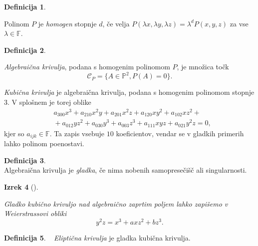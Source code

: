 \documentclass[12pt,a4paper,twoside]{article}
\theoremstyle{definition} %
\newtheorem{definicija}{Definicija}[section]
\theoremstyle{plain} %
\newtheorem{izrek}[definicija]{Izrek}
\numberwithin{equation}{section}  %
\newcommand{\F}{\mathbb F}
\begin{document}
\begin{definicija}~

Polinom $P$ je \emph{homogen} stopnje $d$, če velja $P(\lambda x,\lambda y, \lambda z) = \lambda ^d P(x,y,z)$ za vse $\lambda \in \F$.
\end{definicija}

\begin{definicija}~

\emph{Algebraična krivulja}, podana s homogenim polinomom $P$, je množica točk 
$$\mathcal{C}_P= \{ A \in \mathbb{P}^2, P(A) = 0 \}.$$
\end{definicija}

\emph{Kubična krivulja} je algebraična krivulja, podana s homogenim polinomom stopnje 3. V splošnem je torej oblike
\begin{align}
&{} a_{300}x^3+a_{210}x^2y+a_{201}x^2z+a_{120}xy^2+a_{102}xz^2+ \nonumber \\
&{}+a_{012}yz^2+a_{030}y^3+a_{003}z^3+a_{111}xyz+a_{021}y^2z = 0, \nonumber
\end{align}
kjer so $a_{ijk} \in \F$.
Ta zapis vsebuje $10$ koeficientov, vendar se v gladkih primerih lahko polinom poenostavi.
\begin{definicija}~\\
Algebraična krivulja je \emph{gladka}, če nima nobenih samopresečišč ali singularnosti.
\end{definicija}

\begin{izrek}[]~

Gladko kubično krivuljo nad algebraično zaprtim poljem lahko zapišemo v Weierstrassovi obliki
$$y^2z = x^3 + axz^2 + bz^3.$$
\end{izrek}


\begin{definicija}~
\emph{Eliptična krivulja} je gladka kubična krivulja.
\end{definicija}
\end{document}
